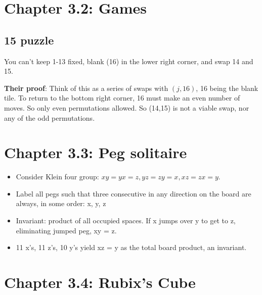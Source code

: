 \documentclass[11pt, oneside]{article}   	%
\begin{document}
 \section{Chapter 3.2: Games}
 \subsection{15 puzzle}
 
 You can't keep 1-13 fixed, blank (16) in the lower right corner, and swap 14 and 15.
 
\textbf{Their proof}: Think of this as a series of swaps with $(j, 16)$, 16 being the blank tile.  To return to the bottom right corner, 16 must make an even number of moves.  So only even permutations allowed.  So (14,15) is not a viable swap, nor any of the odd permutations.  

\section{Chapter 3.3: Peg solitaire}

\begin{itemize}
\item Consider Klein four group: $xy = yx = z, yz = zy = x, xz = zx = y$.  
\item Label all pegs such that three consecutive in any direction on the board are always, in some order: x, y, z
\item Invariant: product of all occupied spaces.  If x jumps over y to get to z, eliminating jumped peg, xy = z.
\item 11  x's, 11 z's, 10 y's yield xz = y as the total board product, an invariant.
\end{itemize}

\section{Chapter 3.4: Rubix's Cube}
\end{document}
